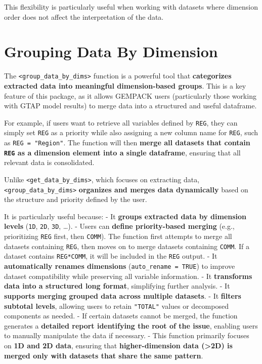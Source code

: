 \documentclass[
]{article}
\begin{document}
This flexibility is particularly useful when working with datasets where
dimension order does not affect the interpretation of the data.

\section{Grouping Data By Dimension}\label{grouping-data-by-dimension}

The \texttt{\textless{}group\_data\_by\_dims\textgreater{}} function is
a powerful tool that \textbf{categorizes extracted data into meaningful
dimension-based groups}. This is a key feature of this package, as it
allows GEMPACK users (particularly those working with GTAP model
results) to merge data into a structured and useful dataframe.

For example, if users want to retrieve all variables defined by
\texttt{REG}, they can simply set \texttt{REG} as a priority while also
assigning a new column name for \texttt{REG}, such as
\texttt{REG\ =\ "Region"}. The function will then \textbf{merge all
datasets that contain \texttt{REG} as a dimension element into a single
dataframe}, ensuring that all relevant data is consolidated.

Unlike \texttt{\textless{}get\_data\_by\_dims\textgreater{}}, which
focuses on extracting data,
\texttt{\textless{}group\_data\_by\_dims\textgreater{}}
\textbf{organizes and merges data dynamically} based on the structure
and priority defined by the user.

It is particularly useful because: - It \textbf{groups extracted data by
dimension levels} (\texttt{1D}, \texttt{2D}, \texttt{3D}, \ldots). -
Users can \textbf{define priority-based merging} (e.g., prioritizing
\texttt{REG} first, then \texttt{COMM}). The function first attempts to
merge all datasets containing \texttt{REG}, then moves on to merge
datasets containing \texttt{COMM}. If a dataset contains
\texttt{REG*COMM}, it will be included in the \texttt{REG} output. - It
\textbf{automatically renames dimensions}
(\texttt{auto\_rename\ =\ TRUE}) to improve dataset compatibility while
preserving all variable information. - It \textbf{transforms data into a
structured long format}, simplifying further analysis. - It
\textbf{supports merging grouped data across multiple datasets}. - It
\textbf{filters subtotal levels}, allowing users to retain
\texttt{"TOTAL"} values or decomposed components as needed. - If certain
datasets cannot be merged, the function generates a \textbf{detailed
report identifying the root of the issue}, enabling users to manually
manipulate the data if necessary. - This function primarily focuses on
\textbf{1D and 2D data}, ensuring that \textbf{higher-dimension data
(\textgreater2D) is merged only with datasets that share the same
pattern}.
\end{document}
